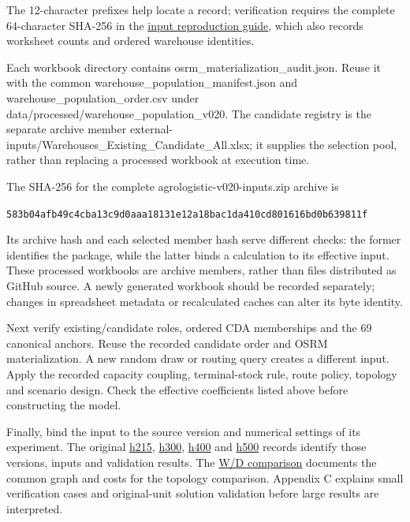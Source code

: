 \documentclass[
  english,
  11pt,
  a4paper,
]{article}
\begin{document}
The 12-character prefixes help locate a record; verification requires
the complete 64-character SHA-256 in the
\href{https://github.com/unb-lamfo-or-ai-hpc/model-agrologistic/blob/1b54023f4e0c0c27aba64883b1e9cf25817ad0f8/docs/evidence/appendix_input_reproduction_20261028.json}{input
reproduction guide}, which also records worksheet counts and ordered
warehouse identities.

Each workbook directory contains osrm\_materialization\_audit.json.
Reuse it with the common warehouse\_population\_manifest.json and
warehouse\_population\_order.csv under
data/processed/warehouse\_population\_v020. The candidate registry is
the separate archive member
external-inputs/Warehouses\_Existing\_Candidate\_All.xlsx; it supplies
the selection pool, rather than replacing a processed workbook at
execution time.

The SHA-256 for the complete agrologistic-v020-inputs.zip archive is

\texttt{583b04afb49c4cba13c9d0aaa18131e12a18bac1da410cd801616bd0b639811f}

Its archive hash and each selected member hash serve different checks:
the former identifies the package, while the latter binds a calculation
to its effective input. These processed workbooks are archive members,
rather than files distributed as GitHub source. A newly generated
workbook should be recorded separately; changes in spreadsheet metadata
or recalculated caches can alter its byte identity.

Next verify existing/candidate roles, ordered CDA memberships and the 69
canonical anchors. Reuse the recorded candidate order and OSRM
materialization. A new random draw or routing query creates a different
input. Apply the recorded capacity coupling, terminal-stock rule, route
policy, topology and scenario design. Check the effective coefficients
listed above before constructing the model.

Finally, bind the input to the source version and numerical settings of
its experiment. The original
\href{https://github.com/unb-lamfo-or-ai-hpc/model-agrologistic/blob/1b54023f4e0c0c27aba64883b1e9cf25817ad0f8/docs/evidence/scalar_h215_2217990_review.json}{h215},
\href{https://github.com/unb-lamfo-or-ai-hpc/model-agrologistic/blob/1b54023f4e0c0c27aba64883b1e9cf25817ad0f8/docs/evidence/scalar_h300_2218193_review.json}{h300},
\href{https://github.com/unb-lamfo-or-ai-hpc/model-agrologistic/blob/1b54023f4e0c0c27aba64883b1e9cf25817ad0f8/docs/evidence/scalar_h400_2219884_review.json}{h400}
and
\href{https://github.com/unb-lamfo-or-ai-hpc/model-agrologistic/blob/1b54023f4e0c0c27aba64883b1e9cf25817ad0f8/docs/evidence/scalar_h500_2220382_review.json}{h500}
records identify those versions, inputs and validation results. The
\href{https://github.com/unb-lamfo-or-ai-hpc/model-agrologistic/blob/1b54023f4e0c0c27aba64883b1e9cf25817ad0f8/docs/evidence/scalar_wd_h215_input_inspection_20261022.json}{W/D
comparison} documents the common graph and costs for the topology
comparison. Appendix C explains small verification cases and
original-unit solution validation before large results are interpreted.
\end{document}
